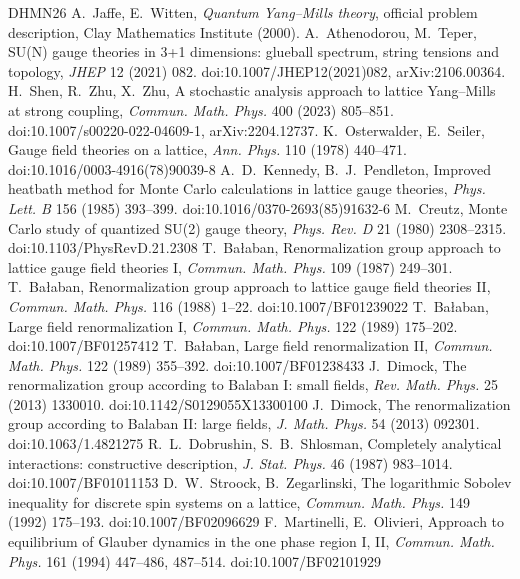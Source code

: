 \documentclass[11pt,a4paper]{article}
\begin{document}
\begin{thebibliography}{DHMN26}
\small
{} A.~Jaffe, E.~Witten, \emph{Quantum Yang--Mills theory}, official problem description, Clay Mathematics Institute (2000).
 A.~Athenodorou, M.~Teper, SU(N) gauge theories in 3+1 dimensions: glueball spectrum, string tensions and topology, \emph{JHEP} 12 (2021) 082. doi:10.1007/JHEP12(2021)082, arXiv:2106.00364.
 H.~Shen, R.~Zhu, X.~Zhu, A stochastic analysis approach to lattice Yang--Mills at strong coupling, \emph{Commun. Math. Phys.} 400 (2023) 805--851. doi:10.1007/s00220-022-04609-1, arXiv:2204.12737.
 K.~Osterwalder, E.~Seiler, Gauge field theories on a lattice, \emph{Ann. Phys.} 110 (1978) 440--471. doi:10.1016/0003-4916(78)90039-8
 A.~D.~Kennedy, B.~J.~Pendleton, Improved heatbath method for Monte Carlo calculations in lattice gauge theories, \emph{Phys. Lett. B} 156 (1985) 393--399. doi:10.1016/0370-2693(85)91632-6
 M.~Creutz, Monte Carlo study of quantized SU(2) gauge theory, \emph{Phys. Rev. D} 21 (1980) 2308--2315. doi:10.1103/PhysRevD.21.2308
 T.~Ba{\l}aban, Renormalization group approach to lattice gauge field theories I, \emph{Commun. Math. Phys.} 109 (1987) 249--301.
 T.~Ba{\l}aban, Renormalization group approach to lattice gauge field theories II, \emph{Commun. Math. Phys.} 116 (1988) 1--22. doi:10.1007/BF01239022
 T.~Ba{\l}aban, Large field renormalization I, \emph{Commun. Math. Phys.} 122 (1989) 175--202. doi:10.1007/BF01257412
 T.~Ba{\l}aban, Large field renormalization II, \emph{Commun. Math. Phys.} 122 (1989) 355--392. doi:10.1007/BF01238433
 J.~Dimock, The renormalization group according to Balaban I: small fields, \emph{Rev. Math. Phys.} 25 (2013) 1330010. doi:10.1142/S0129055X13300100
 J.~Dimock, The renormalization group according to Balaban II: large fields, \emph{J. Math. Phys.} 54 (2013) 092301. doi:10.1063/1.4821275
 R.~L.~Dobrushin, S.~B.~Shlosman, Completely analytical interactions: constructive description, \emph{J. Stat. Phys.} 46 (1987) 983--1014. doi:10.1007/BF01011153
 D.~W.~Stroock, B.~Zegarlinski, The logarithmic Sobolev inequality for discrete spin systems on a lattice, \emph{Commun. Math. Phys.} 149 (1992) 175--193. doi:10.1007/BF02096629
 F.~Martinelli, E.~Olivieri, Approach to equilibrium of Glauber dynamics in the one phase region I, II, \emph{Commun. Math. Phys.} 161 (1994) 447--486, 487--514. doi:10.1007/BF02101929

\end{thebibliography}
\end{document}
